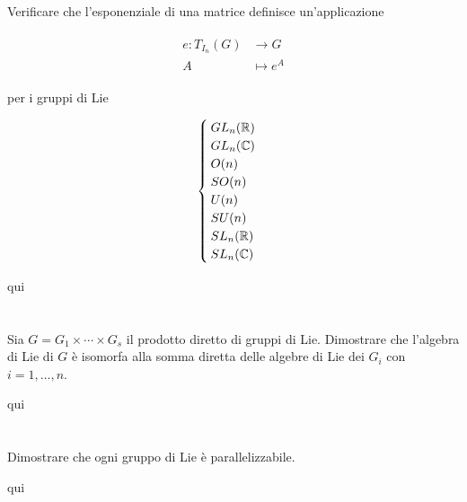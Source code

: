 \begin{tcolorbox}
	Verificare che l'esponenziale di una matrice definisce un'applicazione
	
	\begin{align}
		\begin{split}
			e : T_{I_{n}}(G) &\to G\\
			A &\mapsto e^{A}
		\end{split}
	\end{align}
	
	per i gruppi di Lie
	
	\begin{equation}
		\begin{cases}
			GL_{n}(\mathbb{R})\\
			GL_{n}(\mathbb{C})\\
			O(n)\\
			SO(n)\\
			U(n)\\
			SU(n)\\
			SL_{n}(\mathbb{R})\\
			SL_{n}(\mathbb{C})
		\end{cases}
	\end{equation}
\end{tcolorbox}

qui

%

\newpage

%

\section{}\label{es3-11}

\begin{tcolorbox}
	Sia $ G = G_{1} \times \cdots \times G_{s} $ il prodotto diretto di gruppi di Lie. Dimostrare che l'algebra di Lie di $ G $ è isomorfa alla somma diretta delle algebre di Lie dei $ G_{i} $ con $ i=1,\dots,n $.
\end{tcolorbox}

qui

%

\newpage

%

\section{}\label{es3-12}

\begin{tcolorbox}
	Dimostrare che ogni gruppo di Lie è parallelizzabile.
\end{tcolorbox}

qui
